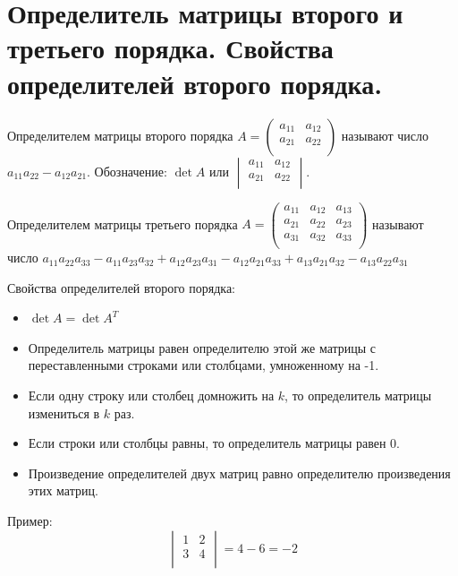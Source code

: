 \documentclass[12pt]{article}
\begin{document}
\begin{sloppypar}
    \section{Определитель матрицы второго и третьего порядка. Свойства определителей второго порядка.}
    Определителем матрицы второго порядка $A = \begin{pmatrix}
            a_{11} & a_{12} \\
            a_{21} & a_{22} \\
        \end{pmatrix}$ называют число $a_{11}a_{22} - a_{12}a_{21}$. Обозначение: $\det A$ или $\begin{vmatrix}
            a_{11} & a_{12} \\
            a_{21} & a_{22} \\
        \end{vmatrix}$.

    Определителем матрицы третьего порядка $A = \begin{pmatrix}
            a_{11} & a_{12} & a_{13} \\
            a_{21} & a_{22} & a_{23} \\
            a_{31} & a_{32} & a_{33} \\
        \end{pmatrix}$ называют число $a_{11}a_{22}a_{33} - a_{11}a_{23}a_{32} + a_{12}a_{23}a_{31} - a_{12}a_{21}a_{33} + a_{13}a_{21}a_{32} - a_{13}a_{22}a_{31}$

    Свойства определителей второго порядка:
    \begin{itemize}
        \item $\det A = \det {A^T}$
        \item Определитель матрицы равен определителю этой же матрицы с переставленными строками или столбцами, умноженному на -1.
        \item Если одну строку или столбец домножить на $k$, то определитель матрицы измениться в $k$ раз.
        \item Если строки или столбцы равны, то определитель матрицы равен 0.
        \item Произведение определителей двух матриц равно определителю произведения этих матриц.
    \end{itemize}


    Пример:
    \[
        \begin{vmatrix}
            1 & 2 \\
            3 & 4 \\
        \end{vmatrix} = 4 - 6 = -2
    \]


\end{sloppypar}
\end{document}
